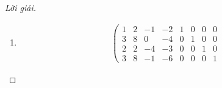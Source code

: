 \documentclass[class=nhvh-linear-algebra,crop=false]{standalone}
\begin{document}
\begin{proof}[Lời giải]
\begin{enumerate}[label = (\alph*)]
\begin{gather*}
\begin{array}{ccc|ccc}
                          0 & 0   & -10 & -3           & -3           & 2
                      \end{array}
                  \right)
                  \stackrel{
                  \substack{
                  r_{1}:= \frac{1}{2}r_{1} \\
                  r_{2}:= \frac{-1}{10}r_{2} \\
                  r_{3}:= \frac{-1}{10}r_{3}
                  }
                  }{\Longleftrightarrow}
                  \left(\begin{array}{ccc|ccc}
                          1 & 0 & 0 & \frac{-9}{10} & \frac{11}{10} & \frac{-2}{5} \\
                          0 & 1 & 0 & \frac{1}{10}  & \frac{-9}{10} & \frac{3}{5}  \\
                          0 & 0 & 1 & \frac{3}{10}  & \frac{3}{10}  & \frac{-1}{5}
                      \end{array}
                  \right)
              \end{gather*}
              \par Vậy
              \[
                  \begin{pmatrix}
                      0 & 1 & 3 \\
                      2 & 3 & 5 \\
                      3 & 6 & 7
                  \end{pmatrix}^{-1}
                  =
                  \begin{pmatrix}
                      \frac{-9}{10} & \frac{11}{10} & \frac{-2}{5} \\
                      \frac{1}{10}  & \frac{-9}{10} & \frac{3}{5}  \\
                      \frac{3}{10}  & \frac{3}{10}  & \frac{-1}{5}
                  \end{pmatrix}.
              \]
              \endgroup{}
        \item
              \begingroup{}
              \allowdisplaybreaks{}
              \begin{gather*}
                  \left(\begin{array}{cccc|cccc}
                          1 & 2 & -1 & -2 & 1 & 0 & 0 & 0 \\
                          3 & 8 & 0  & -4 & 0 & 1 & 0 & 0 \\
                          2 & 2 & -4 & -3 & 0 & 0 & 1 & 0 \\
                          3 & 8 & -1 & -6 & 0 & 0 & 0 & 1

\end{array}
\end{gather*}
\end{enumerate}
\end{proof}
\end{document}
